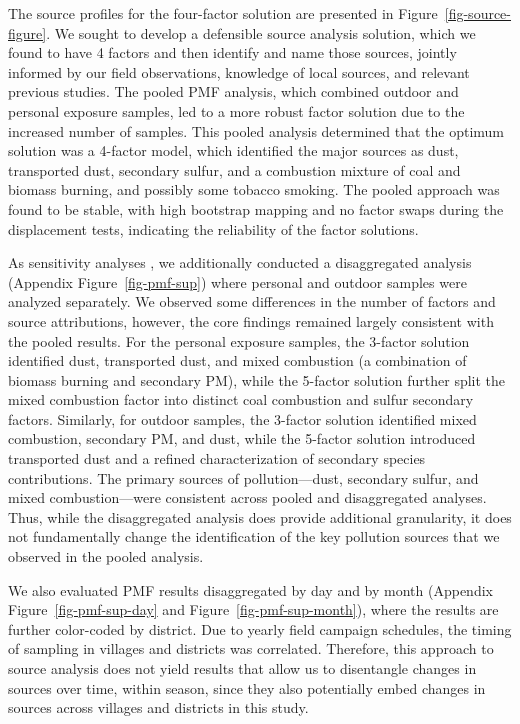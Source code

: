 \documentclass[
  letterpaper,
  DIV=11,
  numbers=noendperiod]{scrartcl}
\begin{document}
The source profiles for the four-factor solution are presented in
Figure~\ref{fig-source-figure}. We sought to develop a defensible source
analysis solution, which we found to have 4 factors and then identify
and name those sources, jointly informed by our field observations,
knowledge of local sources, and relevant previous studies. The pooled
PMF analysis, which combined outdoor and personal exposure samples, led
to a more robust factor solution due to the increased number of samples.
This pooled analysis determined that the optimum solution was a 4-factor
model, which identified the major sources as dust, transported dust,
secondary sulfur, and a combustion mixture of coal and biomass burning,
and possibly some tobacco smoking. The pooled approach was found to be
stable, with high bootstrap mapping and no factor swaps during the
displacement tests, indicating the reliability of the factor solutions.

As sensitivity analyses , we additionally conducted a
disaggregated analysis (Appendix Figure~\ref{fig-pmf-sup}) where
personal and outdoor samples were analyzed separately. We observed some
differences in the number of factors and source attributions, however,
the core findings remained largely consistent with the pooled results.
For the personal exposure samples, the 3-factor solution identified
dust, transported dust, and mixed combustion (a combination of biomass
burning and secondary PM), while the 5-factor solution further split the
mixed combustion factor into distinct coal combustion and sulfur
secondary factors. Similarly, for outdoor samples, the 3-factor solution
identified mixed combustion, secondary PM, and dust, while the 5-factor
solution introduced transported dust and a refined characterization of
secondary species contributions. The primary sources of
pollution---dust, secondary sulfur, and mixed combustion---were
consistent across pooled and disaggregated analyses. Thus, while the
disaggregated analysis does provide additional granularity, it does not
fundamentally change the identification of the key pollution sources
that we observed in the pooled analysis.

We also evaluated PMF results disaggregated by
day and by month (Appendix Figure~\ref{fig-pmf-sup-day} and
Figure~\ref{fig-pmf-sup-month}), where the results are further
color-coded by district. Due to yearly field campaign schedules, the
timing of sampling in villages and districts was correlated. Therefore,
this approach to source analysis does not yield results that allow us to
disentangle changes in sources over time, within season, since they also
potentially embed changes in sources across villages and districts in
this study.
\end{document}
